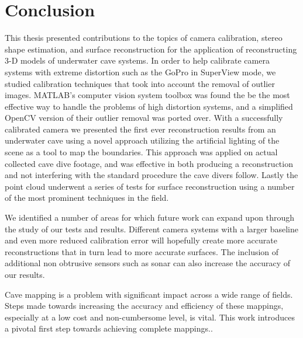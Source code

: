 \chapter*{Conclusion}
This thesis presented contributions to the topics of camera calibration, stereo shape estimation, and surface reconstruction for the application of reconstructing 3\hyp D models of underwater cave systems. In order to help calibrate camera systems with extreme distortion such as the GoPro in SuperView mode, we studied calibration techniques that took into account the removal of outlier images. MATLAB's computer vision system toolbox was found the be the most effective way to handle the problems of high distortion systems, and a simplified OpenCV version of their outlier removal was ported over. With a successfully calibrated camera we presented the first ever reconstruction results from an underwater cave using a novel approach utilizing the artificial lighting of the scene as a tool to map the boundaries. This approach was applied on actual collected cave dive footage, and was effective in both producing a reconstruction and not interfering with the standard procedure the cave divers follow. Lastly the point cloud underwent a series of tests for surface reconstruction using a number of the most prominent techniques in the field.

We identified a number of areas for which future work can expand upon through the study of our tests and results. Different camera systems with a larger baseline and even more reduced calibration error will hopefully create more accurate reconstructions that in turn lead to more accurate surfaces. The inclusion of additional non obtrusive sensors such as sonar can also increase the accuracy of our results. 

Cave mapping is a problem with significant impact across a wide range of fields. Steps made towards increasing the accuracy and efficiency of these mappings, especially at a low cost and non-cumbersome level, is vital. This work introduces a pivotal first step towards achieving complete mappings.. 